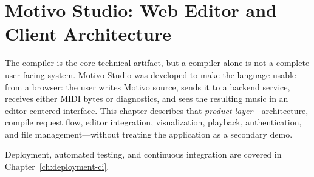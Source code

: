 \chapter{Motivo Studio: Web Editor and Client Architecture}\label{ch:studio-editor}

The compiler is the core technical artifact, but a compiler alone is not a complete user-facing system.
Motivo Studio was developed to make the language usable from a browser: the user writes Motivo source, sends it to a
backend service, receives either MIDI bytes or diagnostics, and sees the resulting music in an editor-centered
interface.
This chapter describes that \textit{product layer}---architecture, compile request flow, editor integration,
visualization, playback, authentication, and file management---without treating the application as a secondary demo.

Deployment, automated testing, and continuous integration are covered in Chapter~\ref{ch:deployment-ci}.




